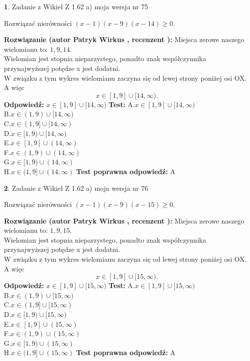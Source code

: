 \documentclass[12pt, a4paper]{article}
\theoremstyle{definition} %
\newtheorem{zad}{}
\newcommand{\zadStart}[1]{\begin{zad}#1\newline}
\newcommand{\zadStop}{\end{zad}}
\newcommand{\rozwStart}[2]{\noindent \textbf{Rozwiązanie (autor #1 , recenzent #2): }\newline}
\newcommand{\rozwStop}{\newline}
\newcommand{\odpStart}{\noindent \textbf{Odpowiedź:}\newline}
\newcommand{\odpStop}{\newline}
\newcommand{\testStart}{\noindent \textbf{Test:}\newline}
\newcommand{\testStop}{\newline}
\newcommand{\kluczStart}{\noindent \textbf{Test poprawna odpowiedź:}\newline}
\newcommand{\kluczStop}{\newline}
\begin{document}
\zadStart{Zadanie z Wikieł Z 1.62 a) moja wersja nr 75}

Rozwiązać nierówności $(x-1)(x-9)(x-14)\ge0$.
\zadStop
\rozwStart{Patryk Wirkus}{}
Miejsca zerowe naszego wielomianu to: $1, 9, 14$.\\
Wielomian jest stopnia nieparzystego, ponadto znak współczynnika przy\linebreak najwyższej potędze x jest dodatni.\\ W związku z tym wykres wielomianu zaczyna się od lewej strony poniżej osi OX. A więc $$x \in [1,9] \cup [14,\infty).$$
\rozwStop
\odpStart
$x \in [1,9] \cup [14,\infty)$
\odpStop
\testStart
A.$x \in [1,9] \cup [14,\infty)$\\
B.$x \in (1,9) \cup [14,\infty)$\\
C.$x \in (1,9] \cup [14,\infty)$\\
D.$x \in [1,9) \cup [14,\infty)$\\
E.$x \in [1,9] \cup (14,\infty)$\\
F.$x \in (1,9) \cup (14,\infty)$\\
G.$x \in [1,9) \cup (14,\infty)$\\
H.$x \in (1,9] \cup (14,\infty)$
\testStop
\kluczStart
A
\kluczStop



\zadStart{Zadanie z Wikieł Z 1.62 a) moja wersja nr 76}

Rozwiązać nierówności $(x-1)(x-9)(x-15)\ge0$.
\zadStop
\rozwStart{Patryk Wirkus}{}
Miejsca zerowe naszego wielomianu to: $1, 9, 15$.\\
Wielomian jest stopnia nieparzystego, ponadto znak współczynnika przy\linebreak najwyższej potędze x jest dodatni.\\ W związku z tym wykres wielomianu zaczyna się od lewej strony poniżej osi OX. A więc $$x \in [1,9] \cup [15,\infty).$$
\rozwStop
\odpStart
$x \in [1,9] \cup [15,\infty)$
\odpStop
\testStart
A.$x \in [1,9] \cup [15,\infty)$\\
B.$x \in (1,9) \cup [15,\infty)$\\
C.$x \in (1,9] \cup [15,\infty)$\\
D.$x \in [1,9) \cup [15,\infty)$\\
E.$x \in [1,9] \cup (15,\infty)$\\
F.$x \in (1,9) \cup (15,\infty)$\\
G.$x \in [1,9) \cup (15,\infty)$\\
H.$x \in (1,9] \cup (15,\infty)$
\testStop
\kluczStart
A
\kluczStop
\end{document}
